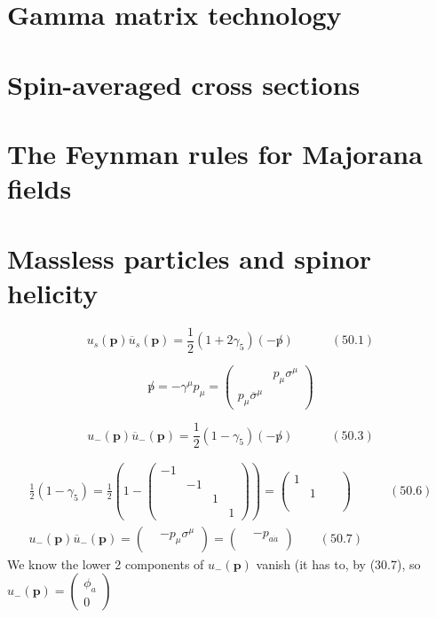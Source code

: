 \documentclass[twoside]{amsart}
\begin{document}
\section{ Gamma matrix technology}

\section{Spin-averaged cross sections}

\section{The Feynman rules for Majorana fields}

\section{Massless particles and spinor helicity}


\[
u_s(\mathbf{p}) \overline{u}_s(\mathbf{p}) = \frac{1}{2} ( 1 + 2 \gamma_5) ( - \not p) \quad \quad \quad (50.1) 
\]

\[
 \not p = - \gamma^{\mu} p_{\mu} = \left( \begin{matrix} & p_{\mu} \sigma^{\mu} \\ p_{\mu} \overline{\sigma}^{\mu} & \end{matrix} \right)
\]

\[
u_-(\mathbf{p}) \overline{u}_-(\mathbf{p}) = \frac{1}{2} ( 1 - \gamma_5) ( - \not p ) \quad \quad \quad (50.3)
\]

\[
\begin{gathered}
  \frac{1}{2} ( 1 - \gamma_5) = \frac{1}{2} ( 1 -  \left( \begin{matrix} -1 &  & & \\ & -1 & & \\ & & 1 & \\ & & & 1 \end{matrix} \right) ) = \left( \begin{matrix} 1 & & & \\ & 1 & & \\ & & &  \\ & & & \end{matrix} \right) \quad \quad \quad (50.6) \\ 
 u_-(\mathbf{p}) \overline{u}_-(\mathbf{p}) = \left( \begin{matrix} & - p _{\mu} \sigma^{\mu} \\ & \end{matrix} \right) = \left( \begin{matrix} & - p_{a \dot{a}} \\ & \end{matrix} \right) \quad \quad (50.7)
\end{gathered}
\]
We know the lower 2 components of $u_-(\mathbf{p})$ vanish (it has to, by (30.7), so $u_-(\mathbf{p}) = \left( \begin{matrix} \phi_a \\ 0 \end{matrix} \right)$
\end{document}
